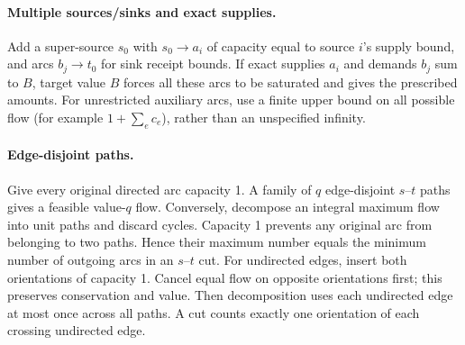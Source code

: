 \paragraph{Multiple sources/sinks and exact supplies.}
Add a super-source $s_0$ with $s_0\to a_i$ of capacity equal to source $i$'s
supply bound, and arcs $b_j\to t_0$ for sink receipt bounds.
If exact supplies $a_i$ and demands $b_j$ sum to $B$, target value $B$ forces
all these arcs to be saturated and gives the prescribed amounts.
For unrestricted auxiliary arcs, use a finite upper bound on all possible
flow (for example $1+\sum_e c_e$), rather than an unspecified infinity.

\paragraph{Edge-disjoint paths.}
Give every original directed arc capacity 1. A family of $q$ edge-disjoint
$s$--$t$ paths gives a feasible value-$q$ flow. Conversely, decompose an
integral maximum flow into unit paths and discard cycles. Capacity 1 prevents
any original arc from belonging to two paths. Hence their maximum number
equals the minimum number of outgoing arcs in an $s$--$t$ cut.
For undirected edges, insert both orientations of capacity 1. Cancel equal
flow on opposite orientations first; this preserves conservation and value.
Then decomposition uses each undirected edge at most once across all paths.
A cut counts exactly one orientation of each crossing undirected edge.

